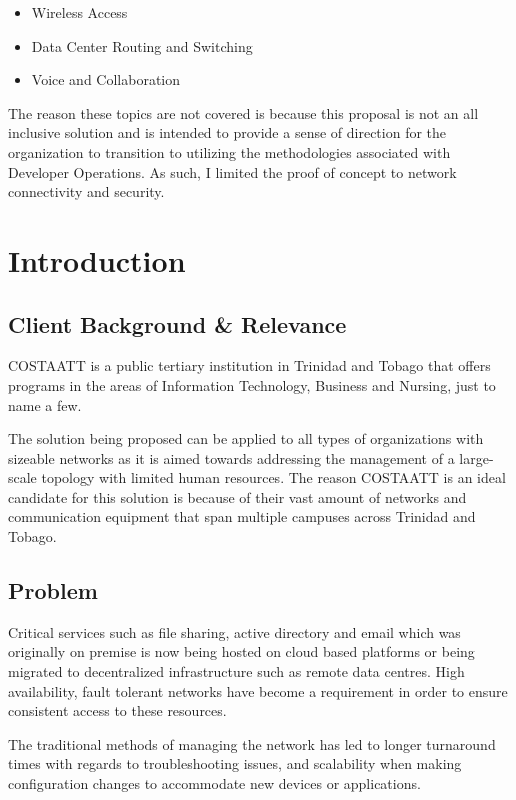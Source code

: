 \documentclass[12pt, letterpaper]{article}
\begin{document}
\begin{itemize}
\item Wireless Access
\item Data Center Routing and Switching
\item Voice and Collaboration
\end{itemize}

The reason these topics are not covered is because this proposal is not an all inclusive solution and is intended to provide a sense of direction for the organization to transition to utilizing the methodologies associated with Developer Operations. As such, I limited the proof of concept to network connectivity and security. 

	
	
\newpage
\section{Introduction}

	\subsection{Client Background \& Relevance}
COSTAATT is a public tertiary institution in Trinidad and Tobago that offers programs in the areas of Information Technology, Business and Nursing, just to name a few.
	
\medskip

The solution being proposed can be applied to all types of organizations with sizeable
networks as it is aimed towards addressing the management of a large-scale topology with limited human resources. The reason COSTAATT is an ideal candidate for this solution is because of their vast amount of networks and communication equipment that span multiple campuses across Trinidad and Tobago. 

	\subsection{Problem}
Critical services such as file sharing, active directory and email which was originally on premise is now being hosted on cloud based platforms or being migrated to decentralized infrastructure such as remote data centres. High availability, fault tolerant networks have become a requirement in order to ensure consistent access to these resources.

\medskip

The traditional methods of managing the network has led to longer turnaround times with regards to troubleshooting issues, and scalability when making configuration changes to accommodate new devices or applications.
\end{document}
